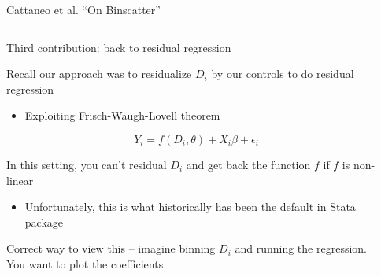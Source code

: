 \documentclass[notes,11pt, aspectratio=169]{beamer}
\newenvironment{wideitemize}{\itemize\addtolength{\itemsep}{10pt}}{\enditemize}
\begin{document}
\begin{frame}{Cattaneo et al. ``On Binscatter''}
  \begin{columns}[T] %
    \begin{column}{.5\textwidth}
      \begin{wideitemize}
      \item Third contribution: back to residual regression
      \item Recall our approach was to residualize $D_{i}$ by our
        controls to do residual regression
        \begin{itemize}
        \item Exploiting Frisch-Waugh-Lovell theorem
        \end{itemize}
        $$ Y_{i} = f(D_{i},\theta) + X_{i}\beta + \epsilon_{i}$$
      \item In this setting, you can't residual $D_{i}$ and get back
        the function $f$ if $f$ is non-linear
        \begin{itemize}
        \item Unfortunately, this is what historically has been the default in Stata package
        \end{itemize}
      \item Correct way to view this -- imagine binning $D_{i}$ and
        running the regression. You want to plot the coefficients
  \end{wideitemize}
  \end{column}%
  \hfill%
  \begin{column}{.5\textwidth}
  \end{column}
\end{columns}
\end{frame}
\end{document}
